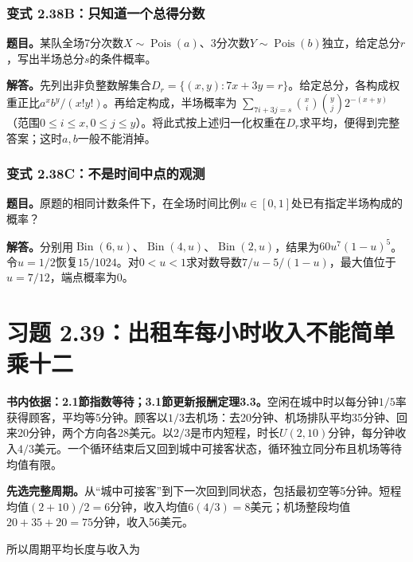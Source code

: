 \documentclass[12pt,a4paper,UTF8,fontset=fandol]{ctexart}
\begin{document}
\subsubsection{变式
2.38B：只知道一个总得分数}\label{ux53d8ux5f0f-2.38bux53eaux77e5ux9053ux4e00ux4e2aux603bux5f97ux5206ux6570}

\textbf{题目。}某队全场7分次数\(X\sim\operatorname{Pois}(a)\)、3分次数\(Y\sim\operatorname{Pois}(b)\)独立，给定总分\(r\)，写出半场总分\(s\)的条件概率。

\textbf{解答。}先列出非负整数解集合\(D_r=\{(x,y):7x+3y=r\}\)。给定总分，各构成权重正比\(a^xb^y/(x!y!)\)。再给定构成，半场概率为
\(\sum_{7i+3j=s}\binom xi\binom yj2^{-(x+y)}\)（范围\(0\le i\le x,0\le j\le y\)）。将此式按上述归一化权重在\(D_r\)求平均，便得到完整答案；这时\(a,b\)一般不能消掉。

\subsubsection{变式
2.38C：不是时间中点的观测}\label{ux53d8ux5f0f-2.38cux4e0dux662fux65f6ux95f4ux4e2dux70b9ux7684ux89c2ux6d4b}

\textbf{题目。}原题的相同计数条件下，在全场时间比例\(u\in[0,1]\)处已有指定半场构成的概率？

\textbf{解答。}分别用\(\operatorname{Bin}(6,u)\)、\(\operatorname{Bin}(4,u)\)、\(\operatorname{Bin}(2,u)\)，结果为\(60u^7(1-u)^5\)。令\(u=1/2\)恢复\(15/1024\)。对\(0<u<1\)求对数导数\(7/u-5/(1-u)\)，最大值位于\(u=7/12\)，端点概率为0。

\section{习题
2.39：出租车每小时收入不能简单乘十二}\label{ux4e60ux9898-2.39ux51faux79dfux8f66ux6bcfux5c0fux65f6ux6536ux5165ux4e0dux80fdux7b80ux5355ux4e58ux5341ux4e8c}

\textbf{书内依据：2.1節指数等待；3.1節更新报酬定理3.3。}空闲在城中时以每分钟\(1/5\)率获得顾客，平均等5分钟。顾客以\(1/3\)去机场：去20分钟、机场排队平均35分钟、回来20分钟，两个方向各28美元。以\(2/3\)是市内短程，时长\(U(2,10)\)分钟，每分钟收入\(4/3\)美元。一个循环结束后又回到城中可接客状态，循环独立同分布且机场等待均值有限。

\textbf{先选完整周期。}从``城中可接客''到下一次回到同状态，包括最初空等5分钟。短程均值\((2+10)/2=6\)分钟，收入均值\(6(4/3)=8\)美元；机场整段均值\(20+35+20=75\)分钟，收入56美元。

所以周期平均长度与收入为
\end{document}
